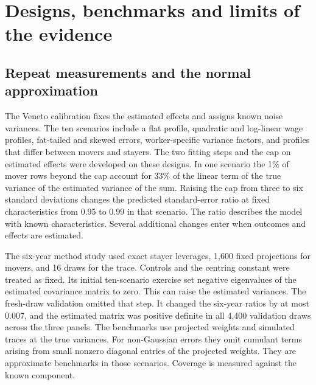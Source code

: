 

\section{Designs, benchmarks and limits of the evidence}\label{app:evidence}

\subsection{Repeat measurements and the normal approximation}
The Veneto calibration fixes the estimated effects and assigns known noise variances.
The ten scenarios include a flat profile, quadratic and log-linear wage profiles,
fat-tailed and skewed errors, worker-specific variance factors, and profiles
that differ between movers and stayers. The two fitting steps and the cap on
estimated effects were developed on these designs. In one scenario the 1\%
of mover rows beyond the cap account for 33\% of the linear term of the
true variance of the estimated variance of the sum. Raising the cap from
three to six standard deviations changes the predicted standard-error ratio
at fixed characteristics from 0.95 to 0.99 in that scenario. The ratio
describes the model with known characteristics. Several additional changes
enter when outcomes and effects are estimated.

The six-year method study used exact stayer leverages, 1,600 fixed projections
for movers, and 16 draws for the trace. Controls and the centring constant
were treated as fixed. Its initial ten-scenario exercise set negative
eigenvalues of the estimated covariance matrix to zero. This can raise the
estimated variances. The fresh-draw validation omitted that step. It changed
the six-year ratios by at most 0.007, and the estimated matrix was positive
definite in all 4,400 validation draws across the three panels. The benchmarks
use projected weights and simulated traces at the true variances. For
non-Gaussian errors they omit cumulant terms arising from small nonzero
diagonal entries of the projected weights. They are approximate benchmarks
in those scenarios. Coverage is measured against the known component.

